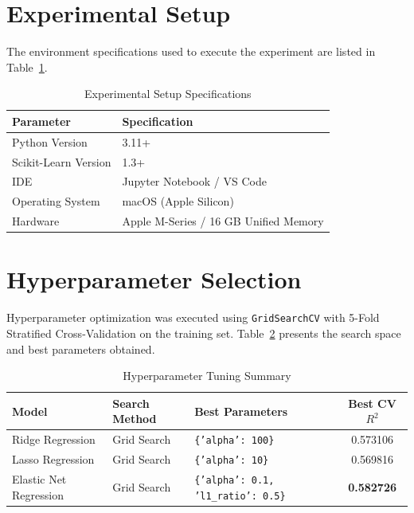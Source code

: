 \documentclass[12pt,a4paper]{article}
\begin{document}
\section{Experimental Setup}
The environment specifications used to execute the experiment are listed in Table~\ref{tab:exp_setup}.

\begin{table}[H]
\centering
\caption{Experimental Setup Specifications}
\label{tab:exp_setup}
\vspace{0.2cm}
\begin{tabular}{ll}
\toprule
\textbf{Parameter} & \textbf{Specification} \\
\midrule
Python Version & 3.11+ \\
Scikit-Learn Version & 1.3+ \\
IDE & Jupyter Notebook / VS Code \\
Operating System & macOS (Apple Silicon) \\
Hardware & Apple M-Series / 16 GB Unified Memory \\
\bottomrule
\end{tabular}
\end{table}

\section{Hyperparameter Selection}
Hyperparameter optimization was executed using \texttt{GridSearchCV} with 5-Fold Stratified Cross-Validation on the training set. Table~\ref{tab:hp_summary} presents the search space and best parameters obtained.

\begin{table}[H]
\centering
\caption{Hyperparameter Tuning Summary}
\label{tab:hp_summary}
\vspace{0.2cm}
\begin{tabular}{lllc}
\toprule
\textbf{Model} & \textbf{Search Method} & \textbf{Best Parameters} & \textbf{Best CV $R^2$} \\
\midrule
Ridge Regression & Grid Search & \texttt{\{'alpha': 100\}} & 0.573106 \\
Lasso Regression & Grid Search & \texttt{\{'alpha': 10\}} & 0.569816 \\
Elastic Net Regression & Grid Search & \texttt{\{'alpha': 0.1, 'l1\_ratio': 0.5\}} & \textbf{0.582726} \\
\bottomrule
\end{tabular}
\end{table}
\end{document}
